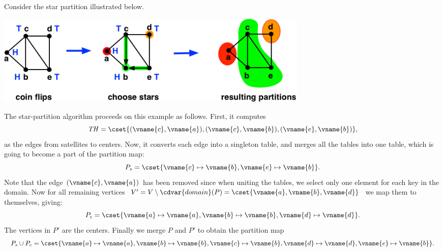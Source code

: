 \begin{flex}
\begin{example}
Consider the star partition illustrated below.
\begin{center}
  \includegraphics[width=6in]{./graph-contraction/media-star/star-find0.jpg}
\end{center}

The  star-partition algorithm proceeds on this example as follows.
%
First, it computes
%
\[
\mathit{TH} =
\cset{(\vname{c},\vname{a}),(\vname{c},\vname{b}),(\vname{e},\vname{b})},
\]
%
as the edges from satellites to centers.  
%
Now, it
converts each edge into a singleton table, and merges all the tables
into one
table, which is going to become a part of the partition map:
%
\[
P_s = \cset{\vname{c} \mapsto \vname{b},\vname{e} \mapsto \vname{b}}.
\]
%
Note that the edge $(\vname{c},\vname{a})$ has been removed since when
uniting the tables, we select only one element for each key in the
domain.  
%
Now for all remaining vertices
%
$V' = V \setminus \cdvar{domain}(P) = \cset{\vname{a},\vname{b},\vname{d}}$
we map them to themselves, giving:
%
\[
P_c = \cset{\vname{a} \mapsto \vname{a}, \vname{b} \mapsto \vname{b},
  \vname{d} \mapsto \vname{d}}.
\]
%
The vertices in $P'$ are the centers.
%
Finally we merge $P$ and $P'$ to obtain the partition map
%
\[
P_s \cup P_c = \cset{\vname{a} \mapsto \vname{a}, \vname{b} \mapsto \vname{b}, \vname{c} \mapsto \vname{b}, \vname{d} \mapsto
    \vname{d}, \vname{e} \mapsto \vname{b}}.
\]
\end{example}
\end{flex}

